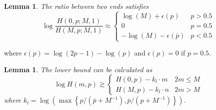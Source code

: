 \documentclass{article}
\newtheorem{lemma}[theorem]{Lemma}
\begin{document}
\begin{lemma}
\label{Ratio1}
The ratio between two ends satisfies
$$\log\frac{H(0,p;M,1)}{H(M,p;M,1)} \approx \left\{
    \begin{array}{cl}
    \log(M)+\epsilon(p) & p>0.5\\
    0 & p=0.5\\
    -\log(M)-\epsilon(\bar{p}) & p<0.5
    \end{array}\right.$$
\end{lemma}
where $\epsilon(p)=\log(2p-1)-\log(p)$ and $\epsilon(p)=0$ if $p=0.5$.
\begin{lemma}
\label{LowBound1}
The lower bound can be calculated as
\begin{equation*}
\log H(m,p)\gtrsim \left\{
    \begin{array}{cl}
    H(0,p)- k_l \cdot m& 2m\leq M\\
    H(M,p)- k_l \cdot n& 2m>M
    \end{array}\right.
\end{equation*}
where $k_l=\log\left(\max\left\{p/(\bar{p}+M^{-1}),\bar{p}/(p+M^{-1})\right\}\right)$.
\end{lemma}
\end{document}
